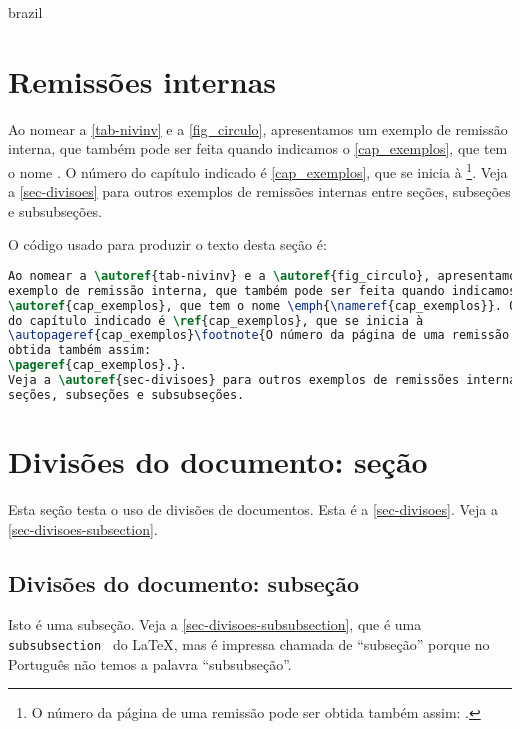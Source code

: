 \begin{otherlanguage*}{brazil}
\section{Remissões internas}

Ao nomear a \autoref{tab-nivinv} e a \autoref{fig_circulo}, apresentamos um
exemplo de remissão interna, que também pode ser feita quando indicamos o
\autoref{cap_exemplos}, que tem o nome \emph{}. O número
do capítulo indicado é \ref{cap_exemplos}, que se inicia à
\footnote{O número da página de uma remissão pode ser
obtida também assim:
\pageref{cap_exemplos}.}.
Veja a \autoref{sec-divisoes} para outros exemplos de remissões internas entre
seções, subseções e subsubseções.

O código usado para produzir o texto desta seção é:

\begin{lstlisting}[language=TeX, caption=TeX example]
Ao nomear a \autoref{tab-nivinv} e a \autoref{fig_circulo}, apresentamos um
exemplo de remissão interna, que também pode ser feita quando indicamos o
\autoref{cap_exemplos}, que tem o nome \emph{\nameref{cap_exemplos}}. O número
do capítulo indicado é \ref{cap_exemplos}, que se inicia à
\autopageref{cap_exemplos}\footnote{O número da página de uma remissão pode ser
obtida também assim:
\pageref{cap_exemplos}.}.
Veja a \autoref{sec-divisoes} para outros exemplos de remissões internas entre
seções, subseções e subsubseções.
\end{lstlisting}

\section{Divisões do documento: seção}\label{sec-divisoes}

Esta seção testa o uso de divisões de documentos. Esta é a
\autoref{sec-divisoes}. Veja a \autoref{sec-divisoes-subsection}.

\subsection{Divisões do documento: subseção}\label{sec-divisoes-subsection}

Isto é uma subseção. Veja a \autoref{sec-divisoes-subsubsection}, que é uma
\texttt{subsubsection  } do \LaTeX{}, mas é impressa chamada de ``subseção'' porque
no Português não temos a palavra ``subsubseção''.





\end{otherlanguage*}
